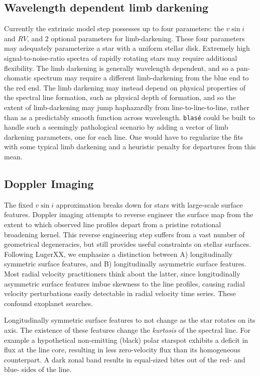 \documentclass[modern]{aastex631}
\begin{document}
\subsection{Wavelength dependent limb darkening}
Currently the extrinsic model step possesses up to four parameters: the $v\sin{i}$ and $RV$, and 2 optional parameters for limb-darkening.  These four parameters may adequately parameterize a star with a uniform stellar disk.  Extremely high signal-to-noise-ratio spectra of rapidly rotating stars may require additional flexibility.  The limb darkening is generally wavelength dependent, and so a pan-chomatic spectrum may require a different limb-darkening from the blue end to the red end.  The limb darkening may instead depend on physical properties of the spectral line formation, such as physical depth of formation, and so the extent of limb-darkening may jump haphazardly from line-to-line-to-line, rather than as a predictably smooth function across wavelength.  \texttt{blas\'e} could be built to handle such a seemingly pathological scenario by adding a vector of limb darkening parameters, one for each line.  One would have to regularize the fits with some typical limb darkening and a heuristic penalty for departures from this mean.

\subsection{Doppler Imaging}
The fixed $v\sin{i}$ approximation breaks down for stars with large-scale surface features.  Doppler imaging  attempts to reverse engineer the surface map from the extent to which observed line profiles depart from a pristine rotational broadening kernel.  This reverse engineering step suffers from a vast number of geometrical degeneracies, but still provides useful constraints on stellar surfaces.  Following LugerXX, we emphasize a distinction between A) longitudinally symmetric surface features, and B) longitudinally asymmetric surface features.  Most radial velocity practitioners think about the latter, since longitudinally asymmetric surface features imbue skewness to the line profiles, causing radial velocity perturbations easily detectable in radial velocity time series.  These confound exoplanet searches.

Longitudinally symmetric surface features to not change as the star rotates on its axis.  The existence of these features change the \emph{kurtosis} of the spectral line.  For example a hypothetical non-emitting (black) polar starspot exhibits a deficit in flux at the line core, resulting in less zero-velocity flux than its homogeneous counterpart.  A dark zonal band results in equal-sized bites out of the red- and blue- sides of the line.
\end{document}
